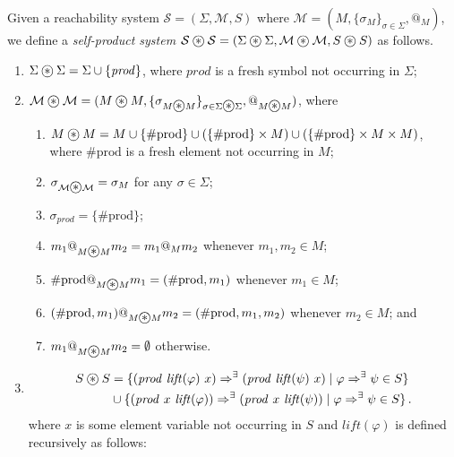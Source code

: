 \documentclass{article}
\newcommand\oast{\stackMath\mathbin{\stackinset{c}{0ex}{c}{0ex}{\ast}{\bigcirc}}}
\begin{document}
\begin{definition}\label{def:RLproduct}
Given a reachability system $\mathcal{S} = (\Sigma, \mathcal{M}, S)$
where $\mathcal{M} = (M, \{\sigma_M\}_{\sigma \in \Sigma}, @_M)$,
we define a \emph{self-product system}
$\mathcal{S}\oast{}\mathcal{S} = (\Sigma\oast{}\Sigma, \mathcal{M}\oast{}\mathcal{M}, S\oast{}S)$ as follows.
\begin{enumerate}
    \item $\Sigma\oast{}\Sigma = \Sigma \cup \{ \mathit{prod} \}$, where $\mathit{prod}$ is a fresh symbol not occurring in $\Sigma$;
    \item $\mathcal{M}\oast{}\mathcal{M} = (M\oast{}M, \{\sigma_{M\oast{}M}\}_{\sigma \in \Sigma\oast{}\Sigma}, @_{M\oast{}M})$, where
    \begin{enumerate}
        \item $M\oast{}M = M \cup \{ \mathrm{\#prod} \} \cup (\{ \mathrm{\#prod} \} \times M) \cup (\{ \mathrm{\#prod} \} \times M \times M)$, where $\mathrm{\#prod}$ is a fresh element not occurring in $M$; 
        \item $\sigma_{\mathcal{M} \oast \mathcal{M}} = \sigma_M$ for any $\sigma \in \Sigma$;
        \item $\sigma_{\mathit{prod}} = \{ \mathrm{\#prod} \}$;
        \item $m_1 @_{M\oast{}M} m_2 = m_1 @_M m_2$ whenever $m_1,m_2 \in M$;
        \item $\mathrm{\#prod} @_{M\oast{}M} m_1 = (\mathrm{\#prod}, m_1)$ whenever $m_1 \in M$;
        \item $(\mathrm{\#prod}, m_1) @_{M\oast{}M} m_2 = (\mathrm{\#prod}, m_1, m_2)$ whenever $m_2 \in M$; and
        \item $m_1 @_{M\oast{}M} m_2 = \emptyset$ otherwise.
    \end{enumerate}
    \item
    \begin{align*}
        S \oast{} S &= \{ (\mathit{prod}\ \mathit{lift}(\varphi)\ x) \Rightarrow^\exists (\mathit{prod}\ \mathit{lift}(\psi)\ x) \mid \varphi \Rightarrow^\exists \psi \in S \} \\
                     & \cup \{ (\mathit{prod}\ x\ \mathit{lift}(\varphi)) \Rightarrow^\exists (\mathit{prod}\ x\ \mathit{lift}(\psi)) \mid \varphi \Rightarrow^\exists \psi \in S \}  \, .
    \end{align*}
    where $x$ is some element variable not occurring in $S$ and $\mathit{lift(\varphi)}$ is defined recursively as follows:
    \begin{itemize}

\end{itemize}
\end{enumerate}
\end{definition}
\end{document}

